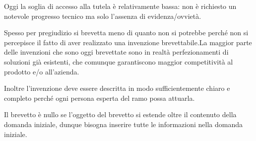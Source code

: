 Oggi la soglia di accesso alla tutela è relativamente bassa: non è richiesto un notevole progresso tecnico ma solo l'assenza di evidenza/ovvietà.

Spesso per pregiudizio si brevetta meno di quanto non si potrebbe perché non si percepisce il fatto di aver realizzato una invenzione brevettabile.La maggior parte delle invenzioni che sono oggi brevettate sono in realtà perfezionamenti di soluzioni già esistenti, che comunque garantiscono maggior competitività al prodotto e/o all’azienda. 

Inoltre l'invenzione deve essere descritta in modo sufficientemente chiaro e completo perché ogni persona esperta del ramo possa attuarla. 

Il brevetto è nullo se l'oggetto del brevetto si estende oltre il contenuto della domanda iniziale, dunque bisogna inserire tutte le informazioni nella domanda iniziale. 
